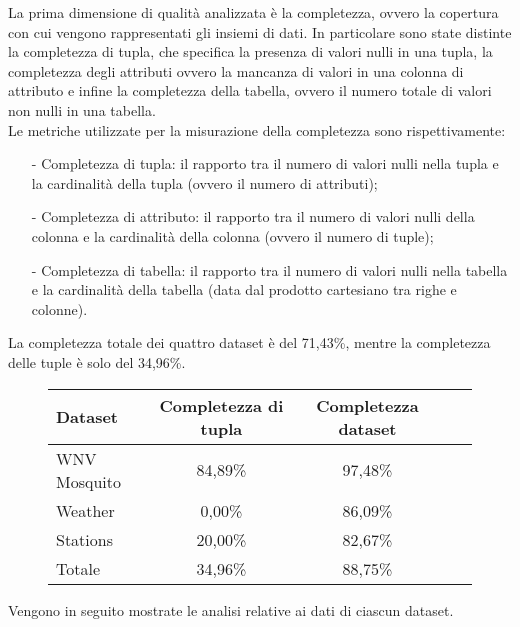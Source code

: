 La prima dimensione di qualità analizzata è la completezza, ovvero la copertura con cui vengono rappresentati gli insiemi di dati.
In particolare sono state distinte la completezza di tupla, che specifica la presenza di valori nulli in una tupla, la completezza degli attributi ovvero la mancanza di valori in una colonna di attributo e infine la completezza della tabella, ovvero il numero totale di valori non nulli in una tabella.\\

Le metriche utilizzate per la misurazione della completezza sono rispettivamente:
\begin{itemize}
		\item[-] Completezza di tupla: il rapporto tra il numero di valori nulli nella tupla e la cardinalità della tupla (ovvero il numero di attributi);
		\item[-] Completezza di attributo: il rapporto tra il numero di valori nulli della colonna e la cardinalità della colonna (ovvero il numero di tuple);
		\item[-] Completezza di tabella: il rapporto tra il numero di valori nulli nella tabella e la cardinalità della tabella (data dal prodotto cartesiano tra righe e colonne).
\end{itemize}


La completezza totale dei quattro dataset è del 71,43\%, mentre la completezza delle tuple è solo del 34,96\%.

\begin{figure}[H]
	\centering
	\begin{tabular}{lcccc}
		\toprule
		\textbf{Dataset} \quad & \textbf{Completezza di tupla} & \textbf{Completezza dataset} \\
		\midrule
		WNV Mosquito &		84,89\%  	& 97,48\%  \\ 
		Weather 	 &		 0,00\% 	& 86,09\%  \\ 
		Stations 	 &		20,00\% 	& 82,67\%  \\ 
		\midrule
		Totale 		 &	    34,96\%     & 88,75\%  \\
		\bottomrule
	\end{tabular}
	\label{tab:completezza totale}
\end{figure}

Vengono in seguito mostrate le analisi relative ai dati di ciascun dataset.

